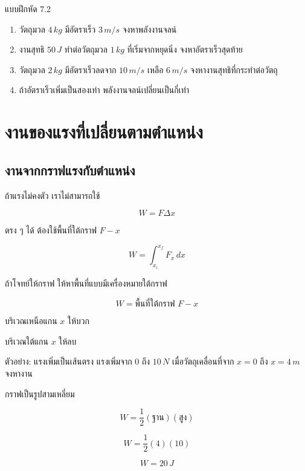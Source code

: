 \begin{exercisebox}{แบบฝึกหัด 7.2}
\begin{enumerate}
    \item วัตถุมวล $4\,\si{kg}$ มีอัตราเร็ว $3\,\si{m/s}$ จงหาพลังงานจลน์
    \item งานสุทธิ $50\,\si{J}$ ทำต่อวัตถุมวล $1\,\si{kg}$ ที่เริ่มจากหยุดนิ่ง จงหาอัตราเร็วสุดท้าย
    \item วัตถุมวล $2\,\si{kg}$ มีอัตราเร็วลดจาก $10\,\si{m/s}$ เหลือ $6\,\si{m/s}$ จงหางานสุทธิที่กระทำต่อวัตถุ
    \item ถ้าอัตราเร็วเพิ่มเป็นสองเท่า พลังงานจลน์เปลี่ยนเป็นกี่เท่า
\end{enumerate}
\end{exercisebox}

\section{งานของแรงที่เปลี่ยนตามตำแหน่ง}

\subsection{งานจากกราฟแรงกับตำแหน่ง}

ถ้าแรงไม่คงตัว เราไม่สามารถใช้

\[
W=F\Delta x
\]

ตรง ๆ ได้ ต้องใช้พื้นที่ใต้กราฟ $F-x$

\[
W=\int_{x_i}^{x_f}F_x\,dx
\]

ถ้าโจทย์ให้กราฟ ให้หาพื้นที่แบบมีเครื่องหมายใต้กราฟ

\begin{tcolorbox}[title=งานจากกราฟ $F-x$]
\[
W=\text{พื้นที่ใต้กราฟ }F-x
\]

บริเวณเหนือแกน $x$ ให้บวก

บริเวณใต้แกน $x$ ให้ลบ
\end{tcolorbox}

\begin{examplebox}{ตัวอย่าง: แรงเพิ่มเป็นเส้นตรง}
แรงเพิ่มจาก $0$ ถึง $10\,\si{N}$ เมื่อวัตถุเคลื่อนที่จาก $x=0$ ถึง $x=4\,\si{m}$ จงหางาน

กราฟเป็นรูปสามเหลี่ยม

\[
W=\frac{1}{2}(\text{ฐาน})(\text{สูง})
\]

\[
W=\frac{1}{2}(4)(10)
\]

\[
W=20\,\si{J}
\]
\end{examplebox}

